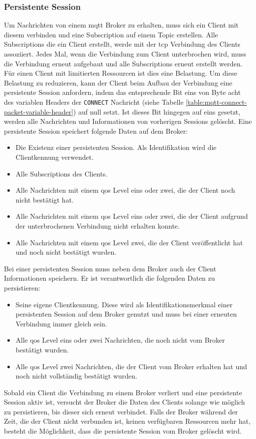 \subsubsection{Persistente Session} \label{s:persistent-session}
Um Nachrichten von einem \ac{mqtt} Broker zu erhalten, muss sich ein Client mit diesem verbinden und eine Subscription auf einem Topic erstellen. Alle Subscriptions die ein Client erstellt, werde mit der \ac{tcp} Verbindung des Clients assoziiert.
Jedes Mal, wenn die Verbindung zum Client unterbrochen wird, muss die Verbindung erneut aufgebaut und alle Subscriptions erneut erstellt werden.
Für einen Client mit limitierten Ressourcen ist dies eine Belastung.
Um diese Belastung zu reduzieren, kann der Client beim Aufbau der Verbindung eine persistente Session anfordern, indem das entsprechende Bit eins von Byte acht des variablen Headers der \verb|CONNECT| Nachricht (siehe Tabelle \ref{table:mqtt-connect-packet-variable-header}) auf null setzt.
Ist dieses Bit hingegen auf eins gesetzt, werden alle Nachrichten und Informationen von vorherigen Sessions gelöscht.
Eine persistente Session speichert folgende Daten auf dem Broker:
\begin{itemize}
    \item Die Existenz einer persistenten Session. Als Identifikation wird die Clientkennung verwendet.
    \item Alle Subscriptions des Clients.
    \item Alle Nachrichten mit einem \ac{qos} Level eins oder zwei, die der Client noch nicht bestätigt hat.
    \item Alle Nachrichten mit einem \ac{qos} Level eins oder zwei, die der Client aufgrund der unterbrochenen Verbindung nicht erhalten konnte.
    \item Alle Nachrichten mit einem \ac{qos} Level zwei, die der Client veröffentlicht hat und noch nicht bestätigt wurden.
\end{itemize}
Bei einer persistenten Session muss neben dem Broker auch der Client Informationen speichern. Er ist verantwortlich die folgenden Daten zu persistieren:
\begin{itemize}
    \item Seine eigene Clientkennung. Diese wird als Identifikationsmerkmal einer persistenten Session auf dem Broker genutzt und muss bei einer erneuten Verbindung immer gleich sein.
    \item Alle \ac{qos} Level eins oder zwei Nachrichten, die noch nicht vom Broker bestätigt wurden.
    \item Alle \ac{qos} Level zwei Nachrichten, die der Client vom Broker erhalten hat und noch nicht vollständig bestätigt wurden.
\end{itemize}
Sobald ein Client die Verbindung zu einem Broker verliert und eine persistente Session aktiv ist, versucht der Broker die Daten des Clients solange wie möglich zu persistieren, bis dieser sich erneut verbindet. Falls der Broker während der Zeit, die der Client nicht verbunden ist, keinen verfügbaren Ressourcen mehr hat, besteht die Möglichkeit, dass die persistente Session vom Broker gelöscht wird.
\cite{teamPersistentSessionQueuing}

